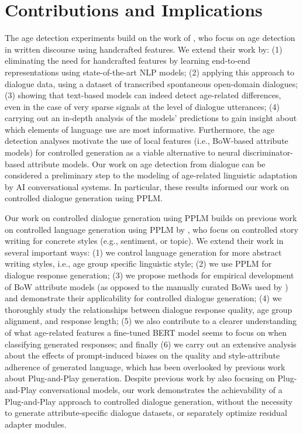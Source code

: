 \section{Contributions and Implications}

The age detection experiments build on the work of \cite{schler2006effects}, who focus on age detection in written discourse using handcrafted features. We extend their work by: (1) eliminating the need for handcrafted features by learning end-to-end representations using state-of-the-art NLP models; (2) applying this approach to dialogue data, using a dataset of transcribed spontaneous open-domain dialogues; (3) showing that text-based models can indeed detect age-related differences, even in the case of very sparse signals at the level of dialogue utterances; (4) carrying out an in-depth analysis of the models' predictions to gain insight about which elements of language use are most informative. Furthermore, the age detection analyses motivate the use of local features (i.e., BoW-based attribute models) for controlled generation as a viable alternative to neural discriminator-based attribute models. Our work on age detection from dialogue can be considered a preliminary step to the modeling of age-related linguistic adaptation by AI conversational systems. In particular, these results informed our work on controlled dialogue generation using PPLM.

Our work on controlled dialogue generation using PPLM builds on previous work on controlled language generation using PPLM by \cite{dathathri2019plug}, who focus on controlled story writing for concrete styles (e.g., sentiment, or topic). We extend their work in several important ways: (1) we control language generation for more abstract writing styles, i.e., age group specific linguistic style; (2) we use PPLM for dialogue response generation; (3) we propose methods for empirical development of BoW attribute models (as opposed to the manually curated BoWs used by \cite{dathathri2019plug}) and demonstrate their applicability for controlled dialogue generation; (4) we thoroughly study the relationships between dialogue response quality, age group alignment, and response length; (5) we also contribute to a clearer understanding of what age-related features a fine-tuned BERT model seems to focus on when classifying generated responses; and finally (6) we carry out an extensive analysis about the effects of prompt-induced biases on the quality and style-attribute adherence of generated language, which has been overlooked by previous work about Plug-and-Play generation. Despite previous work by \cite{madotto-etal-2020-plug} also focusing on Plug-and-Play conversational models, our work demonstrates the achievability of a Plug-and-Play approach to controlled dialogue generation, without the necessity to generate attribute-specific dialogue datasets, or separately optimize residual adapter modules.

